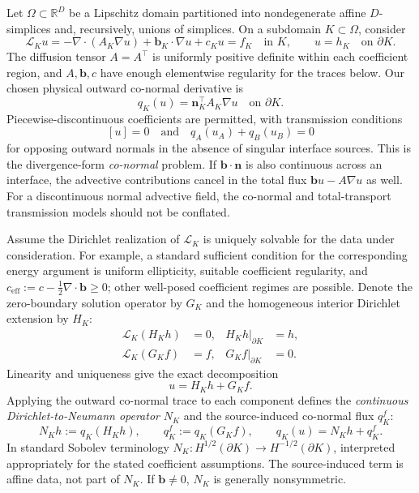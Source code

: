 \documentclass[11pt]{article}
\begin{document}
Let $\Omega\subset\mathbb R^D$ be a Lipschitz domain partitioned into
nondegenerate affine $D$-simplices and, recursively, unions of simplices.
On a subdomain $K\subset\Omega$, consider
\begin{equation}\label{eq:full_cont_operator}
 \mathcal L_Ku
 =-\nabla\cdot(A_K\nabla u)+\bm b_K\cdot\nabla u+c_Ku=f_K
 \quad\text{in }K,
 \qquad u=h_K\quad\text{on }\partial K.
\end{equation}
The diffusion tensor $A=A^\top$ is uniformly positive definite within
each coefficient region, and $A,\bm b,c$ have enough elementwise
regularity for the traces below.  Our chosen physical outward co-normal
derivative is
\begin{equation}\label{eq:full_cont_q}
 q_K(u)=\bm n_K^\top A_K\nabla u\quad\text{on }\partial K.
\end{equation}
Piecewise-discontinuous coefficients are permitted, with transmission
conditions
\begin{equation}\label{eq:full_transmission}
 [u]=0\quad\text{and}\quad q_A(u_A)+q_B(u_B)=0
\end{equation}
for opposing outward normals in the absence of singular interface sources.  This is the divergence-form
\emph{co-normal} problem.  If $\bm b\cdot\bm n$ is also continuous across
an interface, the advective contributions cancel in the total flux
$\bm b u-A\nabla u$ as well.  For a discontinuous normal advective field,
the co-normal and total-transport transmission models should not be
conflated.

Assume the Dirichlet realization of $\mathcal L_K$ is uniquely solvable
for the data under consideration.  For example, a standard sufficient
condition for the corresponding energy argument is uniform ellipticity,
suitable coefficient regularity, and
$c_{\mathrm{eff}}:=c-\tfrac12\nabla\cdot\bm b\ge0$; other well-posed
coefficient regimes are possible.  Denote the zero-boundary solution
operator by $G_K$ and the homogeneous interior Dirichlet extension by
$H_K$:
\begin{align}\label{eq:full_cont_splitting}
 \mathcal L_K(H_Kh)&=0, & H_Kh|_{\partial K}&=h,\\
 \mathcal L_K(G_Kf)&=f, & G_Kf|_{\partial K}&=0.
\end{align}
Linearity and uniqueness give the exact decomposition
\begin{equation}\label{eq:full_cont_u_split}
 u=H_Kh+G_Kf.
\end{equation}
Applying the outward co-normal trace to each component defines the
\emph{continuous Dirichlet-to-Neumann operator} $N_K$ and the
source-induced co-normal flux $q_K^f$:
\begin{equation}\label{eq:full_cont_dtn}
 N_Kh:=q_K(H_Kh),\qquad
 q_K^f:=q_K(G_Kf),\qquad
 \boxed{q_K(u)=N_Kh+q_K^f.}
\end{equation}
In standard Sobolev terminology $N_K:H^{1/2}(\partial K)\to
H^{-1/2}(\partial K)$, interpreted appropriately for the stated
coefficient assumptions.  The source-induced term is affine data, not
part of $N_K$.  If $\bm b\ne0$, $N_K$ is generally nonsymmetric.
\end{document}
